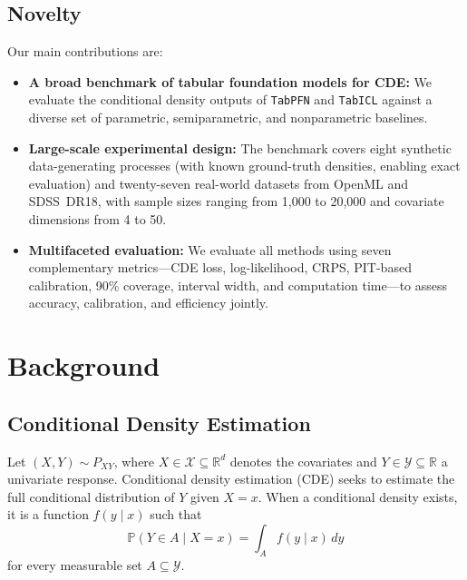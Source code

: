 \documentclass{article}
\newcommand{\method}[1]{\texttt{#1}}
\newcommand{\Prob}{\mathbb{P}}
\newcommand{\R}{\mathbb{R}}
\newcommand{\cX}{\mathcal{X}}
\newcommand{\cY}{\mathcal{Y}}
\begin{document}
\subsection{Novelty}
\label{sec:novelty}

Our main contributions are:

\begin{itemize}[leftmargin=*]
  \item \textbf{A broad benchmark of tabular foundation models for CDE:}
    We evaluate the conditional density outputs of \method{TabPFN} and
    \method{TabICL} against a diverse set of parametric, semiparametric,
    and nonparametric baselines.

  \item \textbf{Large-scale experimental design:}
    The benchmark covers eight synthetic data-generating processes (with
    known ground-truth densities, enabling exact evaluation) and
    twenty-seven real-world datasets from OpenML and SDSS~DR18, with sample
    sizes ranging from 1{,}000 to 20{,}000 and covariate dimensions from
    4 to 50.

  \item \textbf{Multifaceted evaluation:}
    We evaluate all methods using seven complementary metrics---CDE loss,
    log-likelihood, CRPS, PIT-based calibration, 90\% coverage, interval
    width, and computation time---to assess accuracy, calibration, and
    efficiency jointly.
\end{itemize}



\section{Background}
\label{sec:background}

\subsection{Conditional Density Estimation}
\label{sec:cde_background}

Let $(X,Y)\sim P_{XY}$, where $X\in\cX\subseteq\R^d$ denotes the covariates and
$Y\in\cY\subseteq\R$ a univariate response. Conditional density estimation
(CDE) seeks to estimate the full conditional distribution of $Y$ given $X=x$.
When a conditional density exists, it is a function $f(y\mid x)$ such that
\begin{equation}
  \Prob(Y\in A\mid X=x)=\int_A f(y\mid x)\,dy
  \label{eq:cond_density}
\end{equation}
for every measurable set $A\subseteq\cY$.
\end{document}
